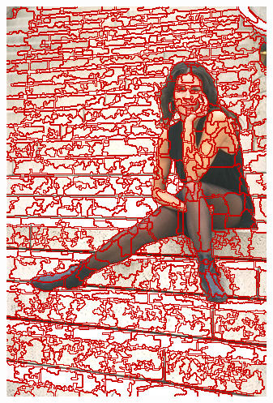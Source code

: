 \begin{figure}
{		\includegraphics[scale=\scalefivebsdtest]{pictures/bsd-test-7-oriseeds}
	}
	\subfigure{
}
\end{figure}
